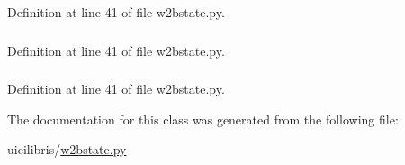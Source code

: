 \-Definition at line 41 of file w2bstate.\-py.

\hypertarget{classuicilibris_1_1w2bstate_1_1w2bstate_ab63a8d91dd1ea7b1ee131b39e7bd4a77}{
\subsubsection[{table\-Errors}]{}}\label{classuicilibris_1_1w2bstate_1_1w2bstate_ab63a8d91dd1ea7b1ee131b39e7bd4a77}


\-Definition at line 41 of file w2bstate.\-py.

\hypertarget{classuicilibris_1_1w2bstate_1_1w2bstate_ae69b1438cdfd3c1ee2f69ec9f3ad3783}{
\subsubsection[{table\-Stack}]{}}\label{classuicilibris_1_1w2bstate_1_1w2bstate_ae69b1438cdfd3c1ee2f69ec9f3ad3783}


\-Definition at line 41 of file w2bstate.\-py.



\-The documentation for this class was generated from the following file\-:\begin{DoxyCompactItemize}
\item 
uicilibris/\hyperlink{w2bstate_8py}{w2bstate.\-py}\end{DoxyCompactItemize}
